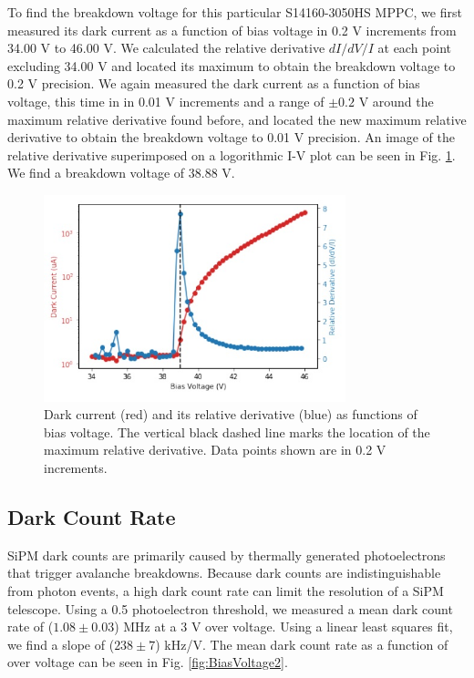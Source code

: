 \documentclass{article}
\begin{document}
To find the breakdown voltage for this particular S14160-3050HS MPPC, we first measured its dark current
as a function of bias voltage in 0.2 V increments from 34.00 V to 46.00 V. We calculated the relative derivative
$dI/dV/I$ at each point excluding 34.00 V and located its maximum to obtain the breakdown voltage to 0.2 V
precision. We again measured the dark current as a function of bias voltage, this time in in 0.01 V increments
and a range of $\pm0.2$ V around the maximum relative derivative found before, and located the new maximum
relative derivative to obtain the breakdown voltage to 0.01 V precision. An image of the relative derivative
superimposed on a logorithmic I-V plot can be seen in Fig. \ref{fig:BiasVoltage}. We find a breakdown voltage of 38.88 V.

\begin{figure}[ht]
    \centering     
    \includegraphics[height=6cm]{images/figura3.jpg}
    
    \caption{Dark current (red) and its relative derivative (blue) as functions of bias voltage. The vertical black dashed line marks the location of the maximum relative derivative. Data points shown are in 0.2 V increments.}
    \label{fig:BiasVoltage}
    
\end{figure}


\subsection{Dark Count Rate}
SiPM dark counts are primarily caused by thermally generated photoelectrons that trigger avalanche breakdowns. Because dark counts are indistinguishable from photon events, a high dark count rate can limit the resolution of a SiPM telescope. Using a 0.5 photoelectron threshold, we measured a mean dark count rate of ($1.08 \pm 0.03$) MHz at a 3 V over voltage. Using a linear least squares fit, we find a slope of ($238 \pm 7$) kHz/V. The mean dark count rate as a function of over voltage can be seen in Fig. \ref{fig:BiasVoltage2}.
\end{document}
